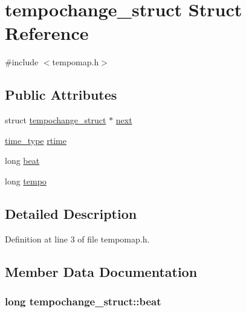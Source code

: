 \hypertarget{structtempochange__struct}{}\section{tempochange\+\_\+struct Struct Reference}
\label{structtempochange__struct}


{\ttfamily \#include $<$tempomap.\+h$>$}

\subsection*{Public Attributes}
\begin{DoxyCompactItemize}
\item 
struct \hyperlink{structtempochange__struct}{tempochange\+\_\+struct} $\ast$ \hyperlink{structtempochange__struct_a90a5916d97068ed0cff912f5ac96b9ed}{next}
\item 
\hyperlink{midifns_8h_a3f787491db5dbc75c21b27d54e9ebae6}{time\+\_\+type} \hyperlink{structtempochange__struct_ae3e15e3f90f822990021df07fc37d6a3}{rtime}
\item 
long \hyperlink{structtempochange__struct_a759f215df129111b5e960bb2dd96d2b1}{beat}
\item 
long \hyperlink{structtempochange__struct_aa306a493598eafab30777e4f47c71525}{tempo}
\end{DoxyCompactItemize}


\subsection{Detailed Description}


Definition at line 3 of file tempomap.\+h.



\subsection{Member Data Documentation}
\subsubsection[{\texorpdfstring{beat}{beat}}]{\setlength{\rightskip}{0pt plus 5cm}long tempochange\+\_\+struct\+::beat}\hypertarget{structtempochange__struct_a759f215df129111b5e960bb2dd96d2b1}{}\label{structtempochange__struct_a759f215df129111b5e960bb2dd96d2b1}



